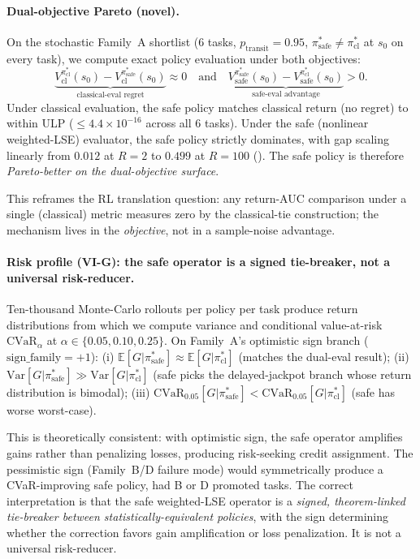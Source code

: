 \paragraph{Dual-objective Pareto (novel).}
On the stochastic Family~A shortlist (6 tasks, $p_\mathrm{transit}=0.95$,
$\pi^*_\mathrm{safe}\neq \pi^*_\mathrm{cl}$ at $s_0$ on every task), we
compute exact policy evaluation under both objectives:
\[
\underbrace{V^{\pi^*_\mathrm{cl}}_\mathrm{cl}(s_0) - V^{\pi^*_\mathrm{safe}}_\mathrm{cl}(s_0)}_{\text{classical-eval regret}} \approx 0 \quad\text{and}\quad
\underbrace{V^{\pi^*_\mathrm{safe}}_\mathrm{safe}(s_0) - V^{\pi^*_\mathrm{cl}}_\mathrm{safe}(s_0)}_{\text{safe-eval advantage}} > 0.
\]
Under classical evaluation, the safe policy matches classical return
(no regret) to within ULP ($\le\!4.4\times 10^{-16}$ across all 6
tasks). Under the safe (nonlinear weighted-LSE) evaluator, the safe
policy strictly dominates, with gap scaling linearly from $0.012$ at
$R=2$ to $0.499$ at $R=100$ (). The safe
policy is therefore \emph{Pareto-better on the dual-objective surface}.

This reframes the RL translation question: any return-AUC comparison
under a single (classical) metric measures zero by the classical-tie
construction; the mechanism lives in the \emph{objective}, not in a
sample-noise advantage.

\paragraph{Risk profile (VI-G): the safe operator is a signed tie-breaker, not a universal risk-reducer.}
Ten-thousand Monte-Carlo rollouts per policy per task produce return
distributions from which we compute variance and conditional
value-at-risk $\mathrm{CVaR}_\alpha$ at $\alpha \in \{0.05, 0.10, 0.25\}$.
On Family~A's optimistic sign branch ($\mathrm{sign\_family}=+1$):
(i) $\mathbb{E}[G | \pi^*_\mathrm{safe}] \approx \mathbb{E}[G | \pi^*_\mathrm{cl}]$ (matches the dual-eval result);
(ii) $\mathrm{Var}[G | \pi^*_\mathrm{safe}] \gg \mathrm{Var}[G | \pi^*_\mathrm{cl}]$ (safe picks the delayed-jackpot branch whose return distribution is bimodal);
(iii) $\mathrm{CVaR}_{0.05}[G | \pi^*_\mathrm{safe}] < \mathrm{CVaR}_{0.05}[G | \pi^*_\mathrm{cl}]$ (safe has worse worst-case).

This is theoretically consistent: with optimistic sign, the safe
operator amplifies gains rather than penalizing losses, producing
risk-seeking credit assignment. The pessimistic sign (Family~B/D
failure mode) would symmetrically produce a CVaR-improving safe
policy, had B or D promoted tasks. The correct interpretation is that
the safe weighted-LSE operator is a \emph{signed, theorem-linked
tie-breaker between statistically-equivalent policies}, with the sign
determining whether the correction favors gain amplification or loss
penalization. It is not a universal risk-reducer.

